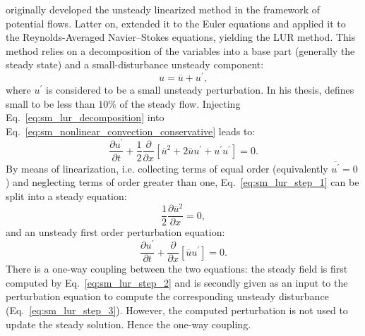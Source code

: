 
\citet{Verdon1984} originally developed the unsteady linearized 
method in the framework of potential flows. Latter on, \citet{Hall1989}
extended it to the Euler equations and
\citet{Clark2000} applied it to the Reynolds-Averaged Navier--Stokes equations,
yielding the LUR method.
This method relies on a decomposition of the variables
into a base part (generally the steady state) 
and a small-disturbance unsteady component:
\begin{equation}
	u = \overline{u} + u^\prime,
	\label{eq:sm_lur_decomposition}
\end{equation}
where $u^\prime$ is considered to be a small unsteady perturbation.
In his thesis,
\citet{Hall1987} defines small to be less than $10\%$ of the
steady flow.
Injecting Eq.~\eqref{eq:sm_lur_decomposition} into 
Eq.~\eqref{eq:sm_nonlinear_convection_conservative} leads to:
\begin{equation}
	\frac{\partial u^\prime}{\partial t} + 
	\frac{1}{2}\frac{\partial}{\partial x} \left[
	\overline{u}^2 + 2 \overline{u} u^\prime + u^\prime u^\prime \right] = 
	0.
	\label{eq:sm_lur_step_1}
\end{equation}
By means of linearization, i.e. collecting terms
of equal order (equivalently $\overline{u^\prime} = 0$) 
and neglecting terms of order greater than one, 
Eq.~\eqref{eq:sm_lur_step_1} can be split
into a steady equation:
\begin{equation}
	\frac{1}{2} \frac{\partial \overline{u}^2}{\partial x} = 0,
	\label{eq:sm_lur_step_2}
\end{equation}
and an unsteady first order perturbation equation:
\begin{equation}
	\frac{\partial u^\prime}{\partial t} +
	\frac{\partial}{\partial x} \left[
	\overline{u} u^\prime \right] = 
	0.
	\label{eq:sm_lur_step_3}
\end{equation}
There is a one-way coupling between the two equations:
the steady field
is first computed by Eq.~\eqref{eq:sm_lur_step_2}
and is secondly given as an input to the
perturbation equation to compute
the corresponding unsteady disturbance (Eq.~\eqref{eq:sm_lur_step_3}). 
However, the computed
perturbation is not used to update the steady solution.
Hence the one-way coupling.

